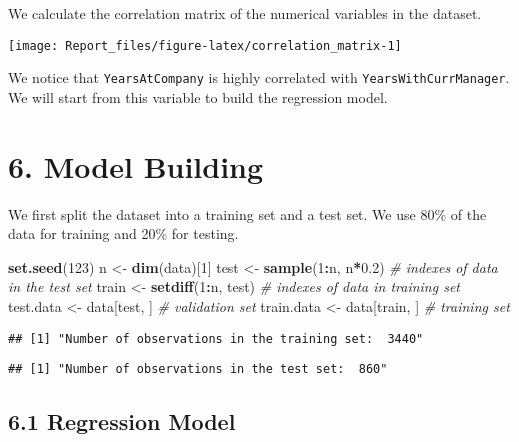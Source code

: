 \documentclass[
]{article}
\newenvironment{Shaded}{\begin{snugshade}}{\end{snugshade}}
\newcommand{\CommentTok}[1]{\textcolor[rgb]{0.56,0.35,0.01}{\textit{#1}}}
\newcommand{\DecValTok}[1]{\textcolor[rgb]{0.00,0.00,0.81}{#1}}
\newcommand{\FloatTok}[1]{\textcolor[rgb]{0.00,0.00,0.81}{#1}}
\newcommand{\FunctionTok}[1]{\textcolor[rgb]{0.13,0.29,0.53}{\textbf{#1}}}
\newcommand{\NormalTok}[1]{#1}
\newcommand{\OtherTok}[1]{\textcolor[rgb]{0.56,0.35,0.01}{#1}}
\newcommand{\SpecialCharTok}[1]{\textcolor[rgb]{0.81,0.36,0.00}{\textbf{#1}}}
\begin{document}
We calculate the correlation matrix of the numerical variables in the
dataset.

\begin{center}\texttt{[image: Report\_files/figure-latex/correlation\_matrix-1]} \end{center}

We notice that \texttt{YearsAtCompany} is highly correlated with
\texttt{YearsWithCurrManager}. We will start from this variable to build
the regression model.

\newpage

\hypertarget{model-building}{%
\section{6. Model Building}\label{model-building}}

We first split the dataset into a training set and a test set. We use
80\% of the data for training and 20\% for testing.

\begin{Shaded}
\begin{Highlighting}[]
\FunctionTok{set.seed}\NormalTok{(}\DecValTok{123}\NormalTok{)}
\NormalTok{n }\OtherTok{\textless{}{-}} \FunctionTok{dim}\NormalTok{(data)[}\DecValTok{1}\NormalTok{]}
\NormalTok{test }\OtherTok{\textless{}{-}} \FunctionTok{sample}\NormalTok{(}\DecValTok{1}\SpecialCharTok{:}\NormalTok{n, n}\SpecialCharTok{*}\FloatTok{0.2}\NormalTok{) }\CommentTok{\# indexes of data in the test set}
\NormalTok{train }\OtherTok{\textless{}{-}} \FunctionTok{setdiff}\NormalTok{(}\DecValTok{1}\SpecialCharTok{:}\NormalTok{n, test) }\CommentTok{\# indexes of data in training set}
\NormalTok{test.data }\OtherTok{\textless{}{-}}\NormalTok{ data[test, ] }\CommentTok{\# validation set}
\NormalTok{train.data }\OtherTok{\textless{}{-}}\NormalTok{ data[train, ] }\CommentTok{\# training set}
\end{Highlighting}
\end{Shaded}

\begin{verbatim}
## [1] "Number of observations in the training set:  3440"
\end{verbatim}

\begin{verbatim}
## [1] "Number of observations in the test set:  860"
\end{verbatim}

\hypertarget{regression-model}{%
\subsection{6.1 Regression Model}\label{regression-model}}
\end{document}
